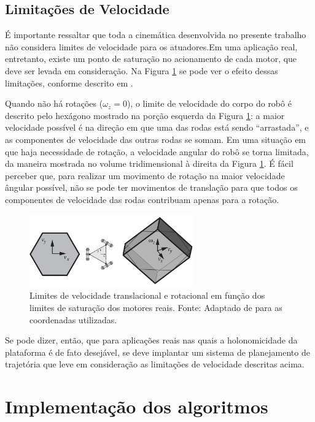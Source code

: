 \subsection{Limitações de Velocidade}

É importante ressaltar que toda a cinemática desenvolvida no presente trabalho não considera limites de velocidade para os atuadores.Em uma aplicação real, entretanto, existe um ponto de saturação no acionamento de cada motor, que deve ser levada em consideração. Na Figura \ref{fig:twist_sat} se pode ver o efeito dessas limitações, conforme descrito em \citet{lynch2017modern}.

Quando não há rotações ($\omega_z = 0$), o limite de velocidade do corpo do robô é descrito pelo hexágono mostrado na porção esquerda da Figura \ref{fig:twist_sat}: a maior velocidade possível é na direção em que uma das rodas está sendo ``arrastada'', e as componentes de velocidade das outras rodas se somam. Em uma situação em que haja necessidade de rotação, a velocidade angular do robô se torna limitada, da maneira mostrada no volume tridimensional à direita da Figura \ref{fig:twist_sat}. É fácil perceber que, para realizar um movimento de rotação na maior velocidade ângular possível, não se pode ter movimentos de translação para que todos os componentes de velocidade das rodas contribuam apenas para a rotação.

\begin{figure}[h]
  \centering
  \includegraphics[width = 0.63\textwidth]{imagens/twist_sat}
  \caption{Limites de velocidade translacional e rotacional em função dos limites de saturação dos motores reais. Fonte: Adaptado de \citet{lynch2017modern} para as coordenadas utilizadas.}
  \label{fig:twist_sat}
\end{figure}

Se pode dizer, então, que para aplicações reais nas quais a holonomicidade da plataforma é de fato desejável, se deve implantar um sistema de planejamento de trajetória que leve em consideração as limitações de velocidade descritas acima.

\section{Implementação dos algoritmos}
\label{sec:software}

